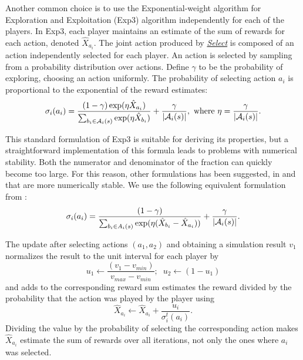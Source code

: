 Another common choice is to use the Exponential-weight algorithm for Exploration and Exploitation (Exp3)
algorithm \cite{Auer2003Exp3} independently for each of the players.
In Exp3, each player maintains an estimate of the sum of rewards for each action, denoted $\hat{X}_{a_i}$.
The joint action produced by \emph{\underline{Select}} is composed of an action independently selected for each player.
An action is selected by sampling from a probability distribution over actions.
Define $\gamma$ to be the probability of exploring, \ie choosing an action uniformly.
The probability of selecting action $a_i$ is proportional to the exponential of the reward estimates:
\begin{equation}\label{eq:exp3select}
\sigma_i(a_i) = \frac{(1-\gamma) \exp(\eta \hat{X}_{a_i})}{\sum_{b_i \in \mathcal{A}_i(s)} \exp(\eta \hat{X}_{b_i})} + \frac{\gamma}{|\mathcal{A}_i(s)|},
  \mbox{ where } \eta = \frac{\gamma}{|\mathcal{A}_i(s)|}.
\end{equation}

This standard formulation of Exp3 is suitable for deriving its properties, but a straightforward implementation of this formula leads to problems with numerical stability. Both the numerator and denominator of the fraction can quickly become too large. For this reason, other formulations has been suggested, \eg in \cite{Lanctot13Goofspiel} and \cite{Cowling12ISMCTS} that are more numerically stable. We use the following equivalent formulation from \cite{Cowling12ISMCTS}:
\begin{equation} \label{eq:exp3:stable}
\sigma_i(a_i) = \frac{(1-\gamma)}{\sum_{b_i \in A_i(s)}\exp(\eta(\hat{X}_{b_i}-\hat{X}_{a_i}))} + \frac{\gamma}{|\mathcal{A}_i(s)|}.
\end{equation}

The update after selecting actions $(a_1,a_2)$ and obtaining a simulation result $v_1$ normalizes the result to the unit interval for each player by
\begin{equation}
u_1 \leftarrow \frac{(v_1 - v_{min})}{v_{max} - v_{min}};\;\; u_2 \leftarrow (1-u_1)
\end{equation}
and adds to the corresponding reward sum estimates the reward divided by the probability that the action was played by the player using
\begin{equation}
\hat{X}_{a_i} \leftarrow \hat{X}_{a_i} + \frac{u_i}{\sigma^t_i(a_i)}.
\end{equation}
Dividing the value by the probability of selecting the corresponding action makes $\hat{X}_{a_i}$ estimate the sum of rewards over all
iterations, not only the ones where $a_i$ was selected.

